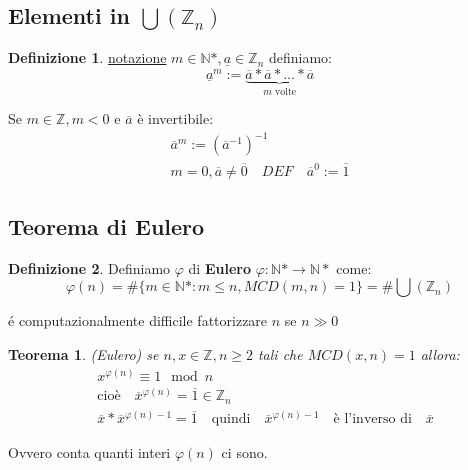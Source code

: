 \documentclass{article}
\newtheorem{theorem}{Teorema}[section]
\theoremstyle{definition}
\newtheorem{definition}{Definizione}[section]
\begin{document}
\subsection{Elementi in $ \bigcup(\mathbb{Z}_n) $}
\begin{definition}
        \underline{notazione} $m \in \mathbb{N}*, \underline{a} \in \mathbb{Z}_n$ definiamo:
        \begin{equation*}
                \underline{a}^m := \underbrace{\overline{a} * \overline{a} * \ldots * \overline{a}}_{\mbox{$m$ volte}}
        \end{equation*}

        Se $m \in \mathbb{Z}, m < 0$ e $\overline{a}$ è invertibile:
        \begin{align*}
                \overline{a}^m := {(\overline{a}^{-1})}^{-1} \\
                m = 0, \overline{a} \not = \overline{0} \quad DEF \quad \overline{a}^0 := \overline{1}
        \end{align*}
\end{definition}



\subsection{Teorema di Eulero}\label{sec:teorema_di_eulero}
\begin{definition}
        Definiamo $\varphi$ di \textbf{Eulero} $\varphi : \mathbb{N}* \to \mathbb{N}*$ come:
        \begin{equation*}
                \varphi(n) = \# \{m \in \mathbb{N}* : m \le n, MCD(m,n)=1\} = \#\bigcup(\mathbb{Z}_n)
        \end{equation*}
\end{definition}

é computazionalmente difficile fattorizzare $n$ se $n \gg 0$

\begin{tcolorbox}
\begin{theorem}
        (Eulero) se $n,x \in \mathbb{Z}, n \ge 2$ tali che $ MCD(x,n) = 1 $ allora:
        \begin{align*}
                & x^{\varphi(n)} \equiv 1 \mod n \\
                & \mbox{cioè} \quad \overline{x}^{\varphi(n)} = \overline{1} \in \mathbb{Z}_n \\
                & \overline{x} * \overline{x}^{\varphi(n)-1} = \overline{1} \quad \mbox{quindi} \quad \overline{x}^{\varphi(n)-1} \quad \mbox{è l'inverso di} \quad \overline{x}
        \end{align*}
\end{theorem}
\end{tcolorbox}
Ovvero conta quanti interi $\varphi(n)$ ci sono.
\end{document}
